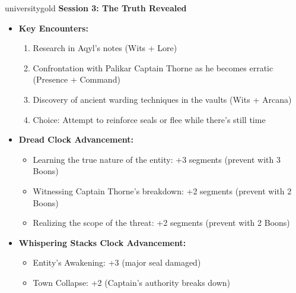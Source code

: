 \documentclass[11pt]{article}
\begin{document}
\begin{campaignsection}{universitygold}
\textbf{Session 3: The Truth Revealed}
\begin{itemize}
    \item \textbf{Key Encounters:}
    \begin{enumerate}
        \item Research in Aqyl's notes (Wits + Lore)
        \item Confrontation with Palikar Captain Thorne as he becomes erratic (Presence + Command)
        \item Discovery of ancient warding techniques in the vaults (Wits + Arcana)
        \item Choice: Attempt to reinforce seals or flee while there's still time
    \end{enumerate}
    \item \textbf{Dread Clock Advancement:}
    \begin{itemize}
        \item Learning the true nature of the entity: +3 segments (prevent with 3 Boons)
        \item Witnessing Captain Thorne's breakdown: +2 segments (prevent with 2 Boons)
        \item Realizing the scope of the threat: +2 segments (prevent with 2 Boons)
    \end{itemize}
    \item \textbf{Whispering Stacks Clock Advancement:}
    \begin{itemize}
        \item Entity's Awakening: +3 (major seal damaged)
        \item Town Collapse: +2 (Captain's authority breaks down)
    \end{itemize}
\end{itemize}
\end{campaignsection}

\newpage
\end{document}
